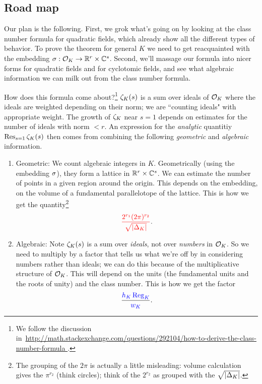 \subsection{Road map}

Our plan is the following. First, we grok what's going on by looking at the class number formula for quadratic fields, which already show all the different types of behavior. To prove the theorem for general $K$ we need to get reacquainted with the embedding $\sigma:\mathcal{O}_K\to \mathbb{R}^r\times \mathbb{C}^s$. %
Second, we'll massage our formula into nicer forms for quadratic fields and for cyclotomic fields, and see what algebraic information we can milk out from the class number formula.

How does this formula come about?\footnote{We follow the discussion in~\url{http://math.stackexchange.com/questions/292104/how-to-derive-the-class-number-formula
}.} 
$\zeta_K(s)$ is a sum over ideals of $\mathcal{O}_K$ where the ideals are weighted depending on their norm; we are ``counting ideals" with appropriate weight. The growth of $\zeta_K$ near $s=1$ depends on estimates for the number of ideals with norm $<r$. An expression for the {\it analytic} quantitiy $\operatorname{Res}_{s=1}\zeta_K(s)$ then comes from combining the following {\it geometric} and {\it algebraic} information.
\begin{enumerate}
\item
Geometric: We count algebraic integers in $K$. Geometrically (using the embedding $\sigma$), they form a lattice in $\mathbb{R}^r\times \mathbb{C}^s$. We can estimate the number of points in a given region around the origin. This depends on the embedding, on the volume of a fundamental parallelotope of the lattice. This is how we get the quantity\footnote{The grouping of the $2\pi$ is actually a little misleading: volume calculation gives the $\pi^{r_2}$ (think circles); think of the $2^{r_2}$ as grouped with the $\sqrt{|\Delta_K|}$.}
\[
{\color{red}\frac{2^{r_1}(2\pi)^{r_2}}{\sqrt{|\Delta_K|}}}.
\]
%
\item
Algebraic: 
Note $\zeta_K(s)$ is a sum over {\it ideals}, not over {\it numbers} in $\mathcal{O}_K$. So we need to multiply by a factor that tells us what we're off by in considering numbers rather than ideals; we can do this because of the multiplicative structure of $\mathcal{O}_K$. This will depend on the units (the fundamental units and the roots of unity) and the class number. This is how we get the factor
\[
\frac{{\color{blue}h_K\operatorname{Reg}_K}}{{\color{blue}w_K}}.
\]
\end{enumerate}

